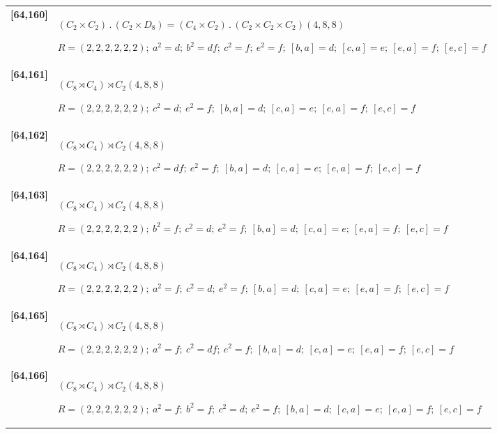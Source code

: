 \documentclass[UTF8,fontset=fandol,11pt,a4paper]{ctexart}
\begin{document}
\begin{longtable}{@{}p{17mm}>{\raggedright\arraybackslash}p{141mm}@{}}
\textbf{[64,160]} & $(C_{2}\times C_{2})\mathbin{.} (C_{2}\times D_{8}) = (C_{4}\times C_{2})\mathbin{.} (C_{2}\times C_{2}\times C_{2})$\quad $(4,8,8)$\par\(R=(2,2,2,2,2,2);\allowbreak\ a^{2}=d;\allowbreak\ b^{2}=df;\allowbreak\ c^{2}=f;\allowbreak\ e^{2}=f;\allowbreak\ [b,a]=d;\allowbreak\ [c,a]=e;\allowbreak\ [e,a]=f;\allowbreak\ [e,c]=f\)\\[3pt]

\textbf{[64,161]} & $(C_{8}\rtimes C_{4})\rtimes C_{2}$\quad $(4,8,8)$\par\(R=(2,2,2,2,2,2);\allowbreak\ c^{2}=d;\allowbreak\ e^{2}=f;\allowbreak\ [b,a]=d;\allowbreak\ [c,a]=e;\allowbreak\ [e,a]=f;\allowbreak\ [e,c]=f\)\\[3pt]

\textbf{[64,162]} & $(C_{8}\rtimes C_{4})\rtimes C_{2}$\quad $(4,8,8)$\par\(R=(2,2,2,2,2,2);\allowbreak\ c^{2}=df;\allowbreak\ e^{2}=f;\allowbreak\ [b,a]=d;\allowbreak\ [c,a]=e;\allowbreak\ [e,a]=f;\allowbreak\ [e,c]=f\)\\[3pt]

\textbf{[64,163]} & $(C_{8}\rtimes C_{4})\rtimes C_{2}$\quad $(4,8,8)$\par\(R=(2,2,2,2,2,2);\allowbreak\ b^{2}=f;\allowbreak\ c^{2}=d;\allowbreak\ e^{2}=f;\allowbreak\ [b,a]=d;\allowbreak\ [c,a]=e;\allowbreak\ [e,a]=f;\allowbreak\ [e,c]=f\)\\[3pt]

\textbf{[64,164]} & $(C_{8}\rtimes C_{4})\rtimes C_{2}$\quad $(4,8,8)$\par\(R=(2,2,2,2,2,2);\allowbreak\ a^{2}=f;\allowbreak\ c^{2}=d;\allowbreak\ e^{2}=f;\allowbreak\ [b,a]=d;\allowbreak\ [c,a]=e;\allowbreak\ [e,a]=f;\allowbreak\ [e,c]=f\)\\[3pt]

\textbf{[64,165]} & $(C_{8}\rtimes C_{4})\rtimes C_{2}$\quad $(4,8,8)$\par\(R=(2,2,2,2,2,2);\allowbreak\ a^{2}=f;\allowbreak\ c^{2}=df;\allowbreak\ e^{2}=f;\allowbreak\ [b,a]=d;\allowbreak\ [c,a]=e;\allowbreak\ [e,a]=f;\allowbreak\ [e,c]=f\)\\[3pt]

\textbf{[64,166]} & $(C_{8}\rtimes C_{4})\rtimes C_{2}$\quad $(4,8,8)$\par\(R=(2,2,2,2,2,2);\allowbreak\ a^{2}=f;\allowbreak\ b^{2}=f;\allowbreak\ c^{2}=d;\allowbreak\ e^{2}=f;\allowbreak\ [b,a]=d;\allowbreak\ [c,a]=e;\allowbreak\ [e,a]=f;\allowbreak\ [e,c]=f\)\\[3pt]


\end{longtable}
\end{document}
